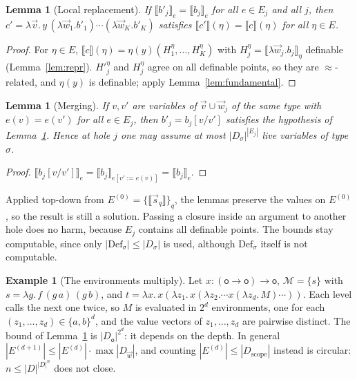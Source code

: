 \documentclass[11pt]{article}
\newcommand{\Ground}{\mathsf{o}\xspace}
\newcommand{\sem}[1]{\llbracket #1\rrbracket}
\newcommand{\Def}{\mathrm{Def}}
\newtheorem{lemma}[theorem]{Lemma}
\theoremstyle{definition}
\newtheorem{example}[theorem]{Example}
\begin{document}
\begin{lemma}[Local replacement]\label{lem:local}
If $\sem{b'_j}_e=\sem{b_j}_e$ for all $e\in E_j$ and all $j$, then
$c'=\lambda\vec v.\,y\,(\lambda\vec w_1.b'_1)\cdots(\lambda\vec w_K.b'_K)$
satisfies $\sem{c'}(\eta)=\sem c(\eta)$ for all $\eta\in E$.
\end{lemma}
\begin{proof}
For $\eta\in E$, $\sem c(\eta)=\eta(y)(H^\eta_1,\ldots,H^\eta_K)$ with
$H^\eta_j=\sem{\lambda\vec w_j.b_j}_\eta$ definable
(Lemma~\ref{lem:repr}).  $H'^\eta_j$ and $H^\eta_j$ agree on all definable
points, so they are $\approx$-related, and $\eta(y)$ is definable;
apply Lemma~\ref{lem:fundamental}.
\end{proof}

\begin{lemma}[Merging]\label{lem:merging}
If $v,v'$ are variables of $\vec v\cup\vec w_j$ of the same type with
$e(v)=e(v')$ for all $e\in E_j$, then $b'_j=b_j[v/v']$ satisfies the
hypothesis of Lemma~\ref{lem:local}.  Hence at hole $j$ one may assume at
most $|D_\sigma|^{|E_j|}$ live variables of type $\sigma$.
\end{lemma}
\begin{proof}
$\sem{b_j[v/v']}_e=\sem{b_j}_{e[v':=e(v)]}=\sem{b_j}_e$.
\end{proof}

Applied top-down from $E^{(0)}=\{\sem{\vec s_q}\}_q$, the lemmas preserve
the values on $E^{(0)}$, so the result is still a solution.  Passing a
closure inside an argument to another hole does no harm, because $E_j$
contains all definable points.  The bounds stay computable, since only
$|\Def_\sigma|\le|D_\sigma|$ is used, although $\Def_\sigma$ itself is not
computable.

\begin{example}[The environments multiply]\label{ex:multiply}
Let $x:(\Ground\to\Ground)\to\Ground$, $\mathcal M=\{s\}$ with
$s=\lambda g.\,f\,(g\,a)\,(g\,b)$, and
$t=\lambda x.\,x(\lambda z_1.\,x(\lambda z_2.\cdots x(\lambda z_d.\,M)\cdots))$.
Each level calls the next one twice, so $M$ is evaluated in $2^d$
environments, one for each $(z_1,\ldots,z_d)\in\{a,b\}^d$, and the value
vectors of $z_1,\ldots,z_d$ are pairwise distinct.  The bound of
Lemma~\ref{lem:merging} is $|D_\Ground|^{2^d}$: it depends on the depth.
In general $|E^{(d+1)}|\le|E^{(d)}|\cdot\max|D_{\vec w}|$, and counting
$|E^{(d)}|\le|D_{\mathrm{scope}}|$ instead is circular: $n\le|D|^{|D|^n}$
does not close.
\end{example}
\end{document}
